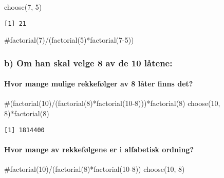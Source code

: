 \documentclass[
  12pt,
  a4paper,
  DIV=11,
  numbers=noendperiod]{scrartcl}
\let\oldparagraph\paragraph
\renewcommand{\paragraph}[1]{\oldparagraph{#1}\mbox{}}
\newenvironment{Shaded}{\begin{snugshade}}{\end{snugshade}}
\newcommand{\CommentTok}[1]{\textcolor[rgb]{0.37,0.37,0.37}{#1}}
\newcommand{\DecValTok}[1]{\textcolor[rgb]{0.68,0.00,0.00}{#1}}
\newcommand{\FunctionTok}[1]{\textcolor[rgb]{0.28,0.35,0.67}{#1}}
\newcommand{\NormalTok}[1]{\textcolor[rgb]{0.00,0.23,0.31}{#1}}
\newcommand{\SpecialCharTok}[1]{\textcolor[rgb]{0.37,0.37,0.37}{#1}}
\begin{document}
\begin{Shaded}
\begin{Highlighting}[]
\FunctionTok{choose}\NormalTok{(}\DecValTok{7}\NormalTok{, }\DecValTok{5}\NormalTok{)}
\end{Highlighting}
\end{Shaded}

\begin{verbatim}
[1] 21
\end{verbatim}

\begin{Shaded}
\begin{Highlighting}[]
\CommentTok{\#factorial(7)/(factorial(5)*factorial(7{-}5))}
\end{Highlighting}
\end{Shaded}

\subsubsection{b) Om han skal velge 8 av de 10
låtene:}\label{b-om-han-skal-velge-8-av-de-10-luxe5tene}

\paragraph{Hvor mange mulige rekkefølger av 8 låter finns
det?}\label{hvor-mange-mulige-rekkefuxf8lger-av-8-luxe5ter-finns-det}

\begin{Shaded}
\begin{Highlighting}[]
\CommentTok{\#(factorial(10)/(factorial(8)*factorial(10{-}8)))*factorial(8)}
\FunctionTok{choose}\NormalTok{(}\DecValTok{10}\NormalTok{, }\DecValTok{8}\NormalTok{)}\SpecialCharTok{*}\FunctionTok{factorial}\NormalTok{(}\DecValTok{8}\NormalTok{)}
\end{Highlighting}
\end{Shaded}

\begin{verbatim}
[1] 1814400
\end{verbatim}

\paragraph{Hvor mange av rekkefølgene er i alfabetisk
ordning?}\label{hvor-mange-av-rekkefuxf8lgene-er-i-alfabetisk-ordning}

\begin{Shaded}
\begin{Highlighting}[]
\CommentTok{\#factorial(10)/(factorial(8)*factorial(10{-}8))}
\FunctionTok{choose}\NormalTok{(}\DecValTok{10}\NormalTok{, }\DecValTok{8}\NormalTok{)}
\end{Highlighting}
\end{Shaded}
\end{document}
